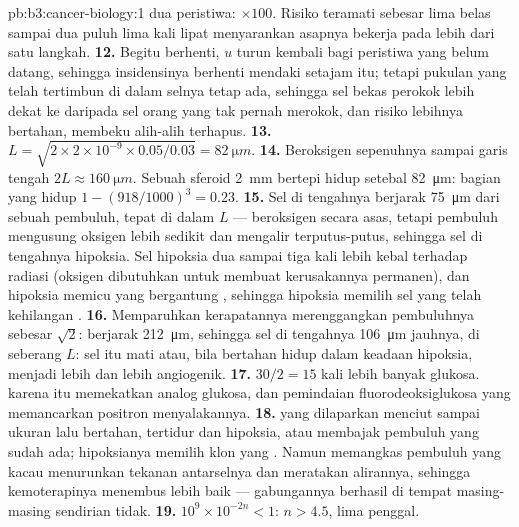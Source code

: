 \begin{solution}{pb:b3:cancer-biology:1}
dua peristiwa: $\times 100$. Risiko teramati sebesar lima belas sampai dua
puluh lima kali lipat menyarankan asapnya bekerja pada lebih dari satu langkah.
\textbf{12.} Begitu berhenti, $u$ turun kembali bagi peristiwa yang belum
datang, sehingga insidensinya berhenti mendaki setajam itu; tetapi pukulan
yang telah tertimbun di dalam selnya tetap ada, sehingga sel bekas perokok
lebih dekat ke  daripada sel orang yang tak pernah merokok, dan risiko
lebihnya bertahan, membeku alih-alih terhapus.
\textbf{13.} $L = \sqrt{2\times 2\times 10^{-9}\times 0.05/0.03} =
\qty{82}{\micro m}$.
\textbf{14.} Beroksigen sepenuhnya sampai garis tengah $2L \approx
\qty{160}{\micro m}$. Sebuah sferoid \qty{2}{mm} bertepi hidup setebal
\qty{82}{\micro m}: bagian yang hidup $1 - (918/1000)^{3} = 0.23$.
\textbf{15.} Sel di tengahnya berjarak \qty{75}{\micro m} dari sebuah
pembuluh, tepat di dalam $L$ --- beroksigen secara asas, tetapi pembuluh 
mengusung oksigen lebih sedikit dan mengalir terputus-putus, sehingga sel di
tengahnya hipoksia. Sel hipoksia dua sampai tiga kali lebih kebal terhadap
radiasi (oksigen dibutuhkan untuk membuat kerusakannya permanen), dan
hipoksia memicu  yang bergantung , sehingga hipoksia memilih sel
yang telah kehilangan .
\textbf{16.} Memparuhkan kerapatannya merenggangkan pembuluhnya sebesar
$\sqrt{2}$: berjarak \qty{212}{\micro m}, sehingga sel di tengahnya
\qty{106}{\micro m} jauhnya, di seberang $L$: sel itu mati atau, bila bertahan
hidup dalam keadaan hipoksia, menjadi lebih  dan lebih angiogenik.
\textbf{17.} $30/2 = 15$ kali lebih banyak glukosa.  karena itu
memekatkan analog glukosa, dan pemindaian fluorodeoksiglukosa yang memancarkan
positron menyalakannya.
\textbf{18.}  yang dilaparkan menciut sampai ukuran  lalu
bertahan, tertidur dan hipoksia, atau membajak pembuluh yang sudah ada;
hipoksianya memilih klon yang . Namun memangkas pembuluh  yang
kacau menurunkan tekanan antarselnya dan meratakan alirannya, sehingga
kemoterapinya menembus lebih baik --- gabungannya berhasil di tempat masing-masing
sendirian tidak.
\textbf{19.} $10^{9}\times 10^{-2n} < 1$: $n > 4.5$, lima penggal.

\end{solution}
